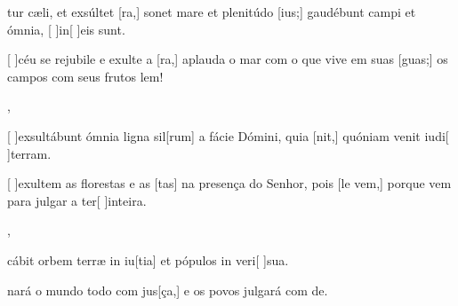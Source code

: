 {  {\item {}tur cæli, et exsúltet [ra,] sonet mare et plenitúdo [ius;] gaudébunt campi et ómnia, [ ]{in}[ ]{e}is sunt.~\Antiphona}%
    {\item {}[ ]{céu} se rejubile e exulte a [ra,] aplauda o mar com o que vive em suas [guas;]  os campos com seus frutos lem!~\Antiphona},
  {\item {}[ ]{ex}sultábunt ómnia ligna sil[rum] a fácie Dómini, quia [nit,] quóniam venit iudi[ ]{ter}ram.~\Antiphona}%
    {\item {}[ ]{e}xultem as florestas e as [tas] na presença do Senhor, pois [le vem,] porque vem para julgar a ter[ ]{in}{tei}ra.~\Antiphona},
  {\item {}cábit orbem terræ in iu[tia] et pópulos in veri[ ]{su}a.~\Antiphona}%
    {\item {}nará o mundo todo com jus[ça,] e os povos julgará com de.~\Antiphona}
}